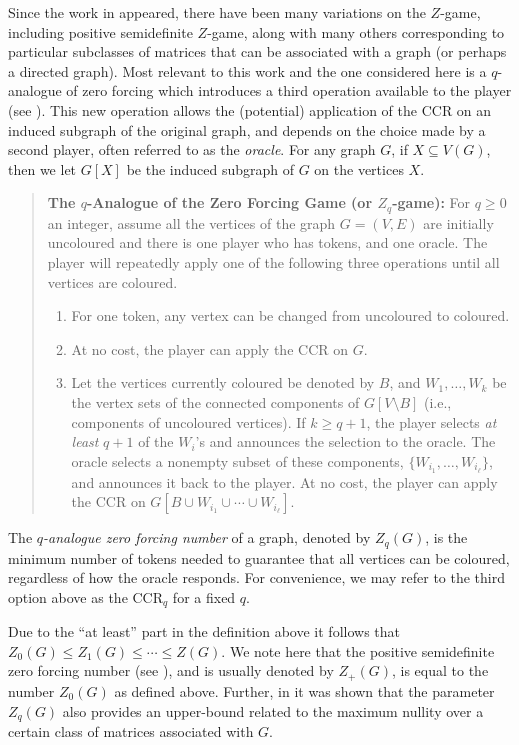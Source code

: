 \documentclass[3p,times,12pt]{article}
\begin{document}
Since the work in \cite{AIM} appeared, there have been many variations on the $Z$-game, including positive semidefinite $Z$-game, along with many others corresponding to particular subclasses of matrices that can be associated with a graph (or perhaps a directed graph). Most relevant to this work and the one considered here is a $q$-analogue of zero forcing  which introduces a third operation available to the player (see \cite{BGH}).  This new operation allows the (potential) application of the CCR on an induced subgraph of the original graph, and depends on the choice made by a second player, often referred to as the {\em oracle}.  For any graph $G$, if $X\subseteq V(G)$, then we let $G[X]$ be the induced subgraph of $G$ on the vertices $X$.
\begin{quote}
{\bf The $q$-Analogue of the Zero Forcing Game (or $Z_q$-game):}  For $q\geq 0$ an integer, assume all the vertices of the graph $G=(V,E)$ are initially uncoloured and there is one player who has tokens, and one oracle.  The player will repeatedly apply one of the following three operations until all vertices are coloured.
\begin{enumerate}
\item For one token, any vertex can be changed from uncoloured to coloured.
\item At no cost, the player can apply the CCR on $G$.
\item Let the vertices currently coloured be denoted by $B$, and $W_1,\ldots,W_k$ be the vertex sets of the connected components of $G[V\setminus B]$ (i.e., components of uncoloured vertices).  If $k\ge q+1$, the player selects \emph{at least}\/ $q+1$ of the $W_i$'s and announces the selection to the oracle.  The oracle selects a nonempty subset of these components, $\{W_{i_1},\ldots,W_{i_\ell}\}$, and announces it back to the player.  At no cost, the player can apply the CCR on $G[B\cup W_{i_1}\cup\cdots\cup W_{i_\ell}]$. 
\end{enumerate}
\end{quote}

The {\em $q$-analogue zero forcing number} of a graph, denoted by $Z_q(G)$, is the minimum number of tokens needed to guarantee that all vertices can be coloured, regardless of how the oracle responds.  
For convenience, we may refer to the third option above as the CCR$_q$ for a fixed $q$.

Due to the ``at least'' part in the definition above it follows that  $Z_0(G)\le Z_1(G)\le\cdots\le Z(G)$. We note here that the positive semidefinite zero forcing number (see \cite{peters}), and is usually denoted by $Z_{+}(G)$, is equal to the number $Z_{0}(G)$ as defined above. Further, in \cite{BGH} it was shown that the parameter $Z_q(G)$ also provides an upper-bound related to the maximum nullity over a certain class of matrices associated with $G$.  
\end{document}
